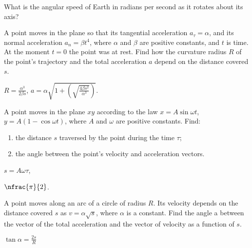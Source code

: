 \begin{problem}
	What is the angular speed of Earth in radians per second as it rotates about its axis?
\end{problem}

\begin{problem}
	A point moves in the plane so that its tangential acceleration 
	$a_\tau = \alpha$, and its normal acceleration $a_n = \beta t^4$, where $\alpha$ and $\beta$ are positive constants, and $t$ is time. At the moment $t = 0$ the point was 
	at rest. Find how the curvature radius $R$ of the point's trajectory and 
	the total acceleration $a$ depend on the distance covered $s$. 
	\begin{solution}
		$R = \frac{\alpha^3}{2\beta s}$, $a = \alpha\sqrt{1 + \left(\sqrt{\frac{4\beta s^2}{\alpha^3}} \right) }$.
	\end{solution}
\end{problem}

\begin{problem}
	A point moves in the plane $xy$ according to the law $x = A\sin\omega t$, $y = A (1 - \cos\omega t)$, where $A$ and $\omega$ are positive constants. Find:
		\begin{enumerate}[label = (\alph*)]
			\item the distance $s$ traversed by the point during the time $\tau$; 
			\item the angle between the point's velocity and acceleration vectors.
		\end{enumerate}		
	\begin{solution}
		\begin{enumerate*}[label = (\alph*)]
			\item $s = A\omega \tau$, 
			\item $\nfrac{\pi}{2}$.
		\end{enumerate*}
	\end{solution}
\end{problem}


\begin{problem}
	A point moves along an arc of a circle of radius $R$. Its velocity 
	depends on the distance covered $s$ as $v = \alpha\sqrt{s}$, where $\alpha$ is a constant. 
	Find the angle a between the vector of the total acceleration and 
	the vector of velocity as a function of $s$. 
	\begin{solution}
		$\tan\alpha = \frac{2s}{R}$
	\end{solution}
\end{problem}

